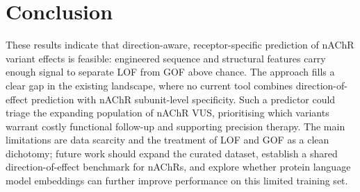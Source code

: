 \documentclass{ws-procs11x85}
\begin{document}
\section{Conclusion}\label{sec:conclusion}
These results indicate that direction-aware, receptor-specific prediction
of nAChR variant effects is feasible: engineered sequence and structural
features carry enough signal to separate LOF from GOF above chance. The
approach fills a clear gap in the existing landscape, where no current
tool combines direction-of-effect prediction with nAChR subunit-level
specificity. Such a predictor could triage the expanding population of
nAChR VUS, prioritising which variants warrant costly functional
follow-up and supporting precision therapy. The main limitations are data
scarcity and the treatment of LOF and GOF as a clean dichotomy; future
work should expand the curated dataset, establish a shared
direction-of-effect benchmark for nAChRs, and explore whether protein
language model embeddings can further improve performance on this
limited training set.
\end{document}
